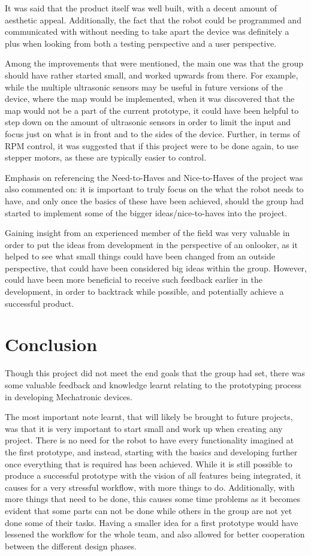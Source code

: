 \documentclass[11pt]{article}
\begin{document}
It was said that the product itself was well built, with a decent amount of aesthetic appeal. Additionally, the fact that the robot could be programmed and communicated with without needing to take apart the device was definitely a plus when looking from both a testing perspective and a user perspective. 

Among the improvements that were mentioned, the main one was that the group should have rather started small, and worked upwards from there. For example, while the multiple ultrasonic sensors may be useful in future versions of the device, where the map would be implemented, when it was discovered that the map would not be a part of the current prototype, it could have been helpful to step down on the amount of ultrasonic sensors in order to limit the input and focus just on what is in front and to the sides of the device. Further, in terms of RPM control, it was suggested that if this project were to be done again, to use stepper motors, as these are typically easier to control.

Emphasis on referencing the Need-to-Haves and Nice-to-Haves of the project was also commented on: it is important to truly focus on the what the robot needs to have, and only once the basics of these have been achieved, should the group had started to implement some of the bigger ideas/nice-to-haves into the project.

Gaining insight from an experienced member of the field was very valuable in order to put the ideas from development in the perspective of an onlooker, as it helped to see what small things could have been changed from an outside perspective, that could have been considered big ideas within the group. However, could have been more beneficial to receive such feedback earlier in the development, in order to backtrack while possible, and potentially achieve a successful product.
\newpage
\section{Conclusion}
Though this project did not meet the end goals that the group had set, there was some valuable feedback and knowledge learnt relating to the prototyping process in developing Mechatronic devices.

The most important note learnt, that will likely be brought to future projects, was that it is very important to start small and work up when creating any project. There is no need for the robot to have every functionality imagined at the first prototype, and instead, starting with the basics and developing further once everything that is required has been achieved. While it is still possible to produce a successful prototype with the vision of all features being integrated, it causes for a very stressful workflow, with more things to do. Additionally, with more things that need to be done, this causes some time problems as it becomes evident that some parts can not be done while others in the group are not yet done some of their tasks. Having a smaller idea for a first prototype would have lessened the workflow for the whole team, and also allowed for better cooperation between the different design phases.
\end{document}
